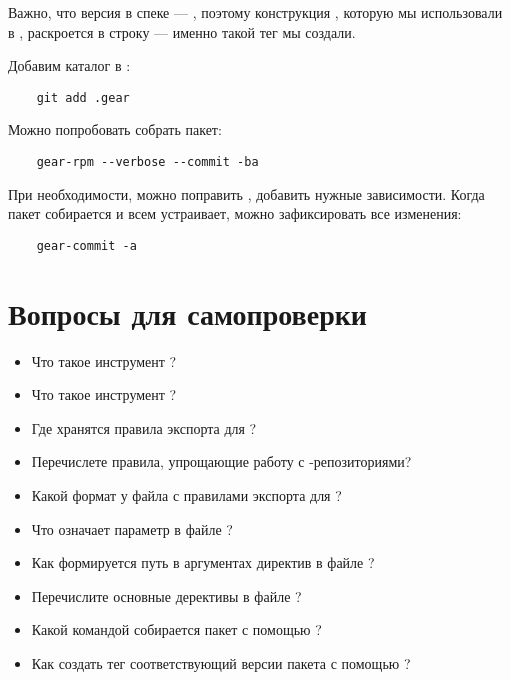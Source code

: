 Важно, что версия в спеке --- , поэтому конструкция , 
которую мы использовали в , раскроется в строку  --- 
именно такой тег  мы создали. 

Добавим каталог  в :
\begin{verbatim}
	git add .gear
\end{verbatim} 

Можно попробовать собрать пакет: 
\begin{verbatim}
	gear-rpm --verbose --commit -ba
\end{verbatim}

При необходимости, можно поправить , добавить нужные зависимости. 
Когда пакет собирается и всем устраивает, можно зафиксировать все изменения: 
\begin{verbatim}
	gear-commit -a
\end{verbatim}

\section{Вопросы для самопроверки}

\begin{itemize}
	\item Что такое инструмент ?
	\item Что такое инструмент ?
	\item Где хранятся правила экспорта для ?
	\item Перечислете правила, упрощающие работу с -репозиториями?
	\item Какой формат у файла с правилами экспорта для ?
	\item Что означает параметр  в файле ?
	\item Как формируется путь в аргументах директив в файле ?
        \item Перечислите основные дерективы в файле ?
	\item Какой командой собирается пакет с помощью ?
        \item Как создать тег соответствующий версии пакета с помощью ?
\end{itemize}

